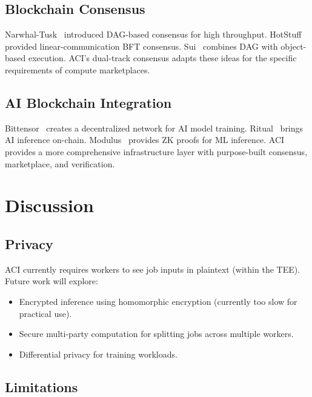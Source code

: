 \documentclass[11pt,twocolumn]{article}
\begin{document}
\subsection{Blockchain Consensus}

Narwhal-Tusk~\cite{danezis2022narwhal} introduced DAG-based consensus for high throughput. HotStuff~\cite{yin2019hotstuff} provided linear-communication BFT consensus. Sui~\cite{sui2023} combines DAG with object-based execution. ACI's dual-track consensus adapts these ideas for the specific requirements of compute marketplaces.

\subsection{AI Blockchain Integration}

Bittensor~\cite{bittensor2023} creates a decentralized network for AI model training. Ritual~\cite{ritual2024} brings AI inference on-chain. Modulus~\cite{modulus2024} provides ZK proofs for ML inference. ACI provides a more comprehensive infrastructure layer with purpose-built consensus, marketplace, and verification.

\section{Discussion}
\label{sec:discussion}

\subsection{Privacy}

ACI currently requires workers to see job inputs in plaintext (within the TEE). Future work will explore:
\begin{itemize}[leftmargin=1.1em]
    \item Encrypted inference using homomorphic encryption (currently too slow for practical use).
    \item Secure multi-party computation for splitting jobs across multiple workers.
    \item Differential privacy for training workloads.
\end{itemize}

\subsection{Limitations}
\end{document}
